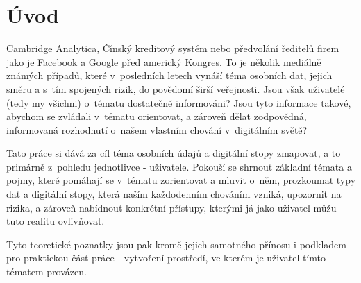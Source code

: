 \chapter*{Úvod}
\pagestyle{plain}

Cambridge Analytica, Čínský kreditový systém nebo předvolání ředitelů firem jako je Facebook a Google před americký Kongres. To je několik mediálně známých případů, které v~posledních letech vynáší téma osobních dat, jejich směru a s~tím spojených rizik, do povědomí širší veřejnosti.
Jsou však uživatelé (tedy my všichni) o~tématu dostatečně informováni? Jsou tyto informace takové, abychom se zvládali v~tématu orientovat, a zároveň dělat zodpovědná, informovaná rozhodnutí o~našem vlastním chování v~digitálním světě?

Tato práce si dává za cíl téma osobních údajů a digitální stopy zmapovat, a to primárně z~pohledu jednotlivce - uživatele. Pokouší se shrnout základní témata a pojmy, které pomáhají se v~tématu zorientovat a mluvit o~něm, prozkoumat typy dat a digitální stopy, která naším každodenním chováním vzniká, upozornit na rizika, a zároveň nabídnout konkrétní přístupy, kterými já jako uživatel můžu tuto realitu ovlivňovat.

Tyto teoretické poznatky jsou pak kromě jejich samotného přínosu i podkladem pro praktickou část práce - vytvoření prostředí, ve kterém je uživatel tímto tématem provázen. 
